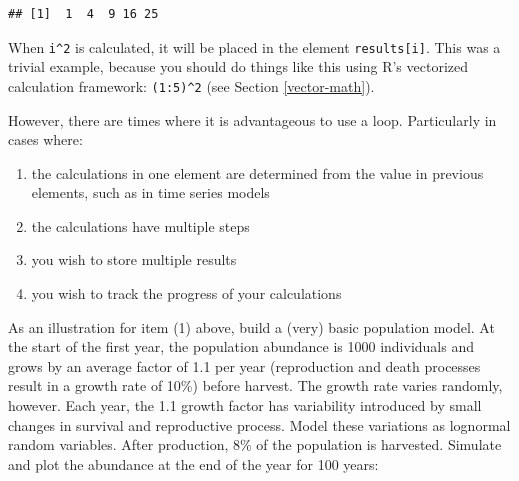 \documentclass[]{book}
\providecommand{\tightlist}{%
  \setlength{\itemsep}{0pt}\setlength{\parskip}{0pt}}
\theoremstyle{definition}
\theoremstyle{definition}
\theoremstyle{definition}
\theoremstyle{remark}
\begin{document}
\begin{verbatim}
## [1]  1  4  9 16 25
\end{verbatim}

When \texttt{i\^{}2} is calculated, it will be placed in the element
\texttt{results{[}i{]}}. This was a trivial example, because you should
do things like this using R's vectorized calculation framework:
\texttt{(1:5)\^{}2} (see Section \ref{vector-math}).

However, there are times where it is advantageous to use a loop.
Particularly in cases where:

\begin{enumerate}
\def\labelenumi{\arabic{enumi}.}
\tightlist
\item
  the calculations in one element are determined from the value in
  previous elements, such as in time series models
\item
  the calculations have multiple steps
\item
  you wish to store multiple results
\item
  you wish to track the progress of your calculations
\end{enumerate}

As an illustration for item (1) above, build a (very) basic population
model. At the start of the first year, the population abundance is 1000
individuals and grows by an average factor of 1.1 per year (reproduction
and death processes result in a growth rate of 10\%) before harvest. The
growth rate varies randomly, however. Each year, the 1.1 growth factor
has variability introduced by small changes in survival and reproductive
process. Model these variations as lognormal random variables. After
production, 8\% of the population is harvested. Simulate and plot the
abundance at the end of the year for 100 years:
\end{document}
